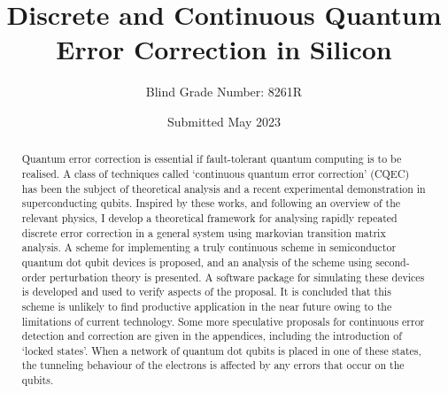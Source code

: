 \documentclass{report}
\title{Discrete and Continuous Quantum Error Correction in Silicon}
\author{Blind Grade Number: 8261R}
\date{Submitted May 2023}
\begin{document}
\maketitle

\begin{abstract}
Quantum error correction is essential if fault-tolerant quantum computing is to be realised. A class of techniques called `continuous quantum error correction' (CQEC) has been the subject of theoretical analysis and a recent experimental demonstration in superconducting qubits. Inspired by these works, and following an overview of the relevant physics, I develop a theoretical framework for analysing rapidly repeated discrete error correction in a general system using markovian transition matrix analysis. A scheme for implementing a truly continuous scheme in semiconductor quantum dot qubit devices is proposed, and an analysis of the scheme using second-order perturbation theory is presented. A software package for simulating these devices is developed and used to verify aspects of the proposal. It is concluded that this scheme is unlikely to find productive application in the near future owing to the limitations of current technology. Some more speculative proposals for continuous error detection and correction are given in the appendices, including the introduction of `locked states'. When a network of quantum dot qubits is placed in one of these states, the tunneling behaviour of the electrons is affected by any errors that occur on the qubits.
\end{abstract}

\tableofcontents
\end{document}
